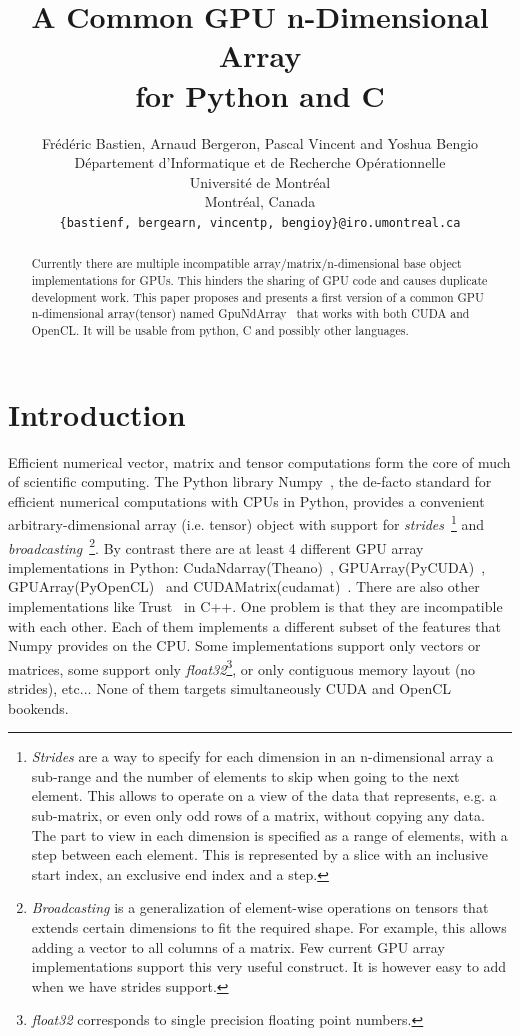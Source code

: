 \documentclass{article} %
\title{A Common GPU n-Dimensional Array \\
 for Python and C}
\author{
Frédéric Bastien, Arnaud Bergeron, Pascal Vincent and Yoshua Bengio \\
D\'epartement d'Informatique et de Recherche Op\'erationnelle\\
Universit\'e de Montr\'eal\\
Montr\'eal, Canada \\
\texttt{\{bastienf, bergearn, vincentp, bengioy\}@iro.umontreal.ca} \\
}
\begin{document}
\maketitle

\begin{abstract}
Currently there are multiple incompatible array/matrix/n-dimensional base object implementations for GPUs. 
This hinders the sharing of GPU code and causes duplicate development work.
This paper proposes and presents a first version of a common GPU n-dimensional array(tensor) named GpuNdArray~\citep{GpuNdArray} that works with both CUDA and OpenCL.
It will be usable from python, C and possibly other languages.
\end{abstract}

\section{Introduction}
Efficient numerical vector, matrix and tensor computations form the core of much of scientific computing.
The Python library Numpy~\citep{numpy-2007}, the de-facto standard for efficient numerical computations with CPUs in Python, provides a convenient 
arbitrary-dimensional array (i.e. tensor) object with support for \emph{strides}~\footnote{
\emph{Strides} are a way to specify for each dimension in an n-dimensional array a sub-range and the number of elements to skip when going
to the next element. 
This allows to operate on a view of the data that represents, e.g. a sub-matrix, or even only odd rows of a matrix, without copying any data.
The part to view in each dimension is specified as a range of elements, with a step between each element.
This is represented by a slice with an inclusive start index, an exclusive end index and a step.
}
and \emph{broadcasting}~\footnote{
\emph{Broadcasting} is a generalization of element-wise operations on tensors that extends certain dimensions to fit the required shape.
For example, this allows adding a vector to all columns of a matrix.
Few current GPU array implementations support this very useful construct.
It is however easy to add when we have strides support.
}.
By contrast there are at least 4 different GPU array implementations in
Python: CudaNdarray(Theano)~\citep{bergstra+al:2010-scipy},
GPUArray(PyCUDA)~\citep{kloeckner_pycuda_2009},
GPUArray(PyOpenCL)~\citep{kloeckner_pycuda_2009} and
CUDAMatrix(cudamat)~\citep{cudamat-TR2009}. 
There are also other implementations like Trust~\citep{Thrust} in C++. 
One problem is that they are incompatible with each other. 
Each of them implements a different subset of the features that Numpy provides on the CPU.
Some implementations support only vectors or matrices, some support only \emph{float32}\footnote{
\emph{float32} corresponds to single precision floating point numbers.
}, or only contiguous memory layout (no strides), etc$\ldots$
None of them targets simultaneously CUDA and OpenCL bookends.
\end{document}
